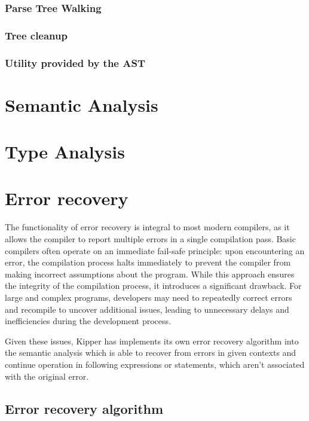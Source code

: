 \subsubsection{Parse Tree Walking}

\subsubsection{Tree cleanup}

\subsubsection{Utility provided by the AST}

\section{Semantic Analysis}
\label{sec:semantic-analysis}

\section{Type Analysis}
\label{sec:type-analysis}

\section{Error recovery}

The functionality of error recovery is integral to most modern compilers, as it allows the compiler to report multiple errors in a single compilation pass. Basic compilers often operate on an immediate fail-safe principle: upon encountering an error, the compilation process halts immediately to prevent the compiler from making incorrect assumptions about the program. While this approach ensures the integrity of the compilation process, it introduces a significant drawback. For large and complex programs, developers may need to repeatedly correct errors and recompile to uncover additional issues, leading to unnecessary delays and inefficiencies during the development process.

Given these issues, Kipper has implements its own error recovery algorithm into the semantic analysis which is able to recover from errors in given contexts and continue operation in following expressions or statements, which aren't associated with the original error.

\subsection{Error recovery algorithm}

